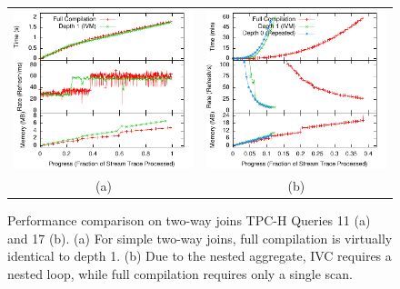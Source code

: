 \begin{figure}
\begin{center}
\vspace*{0.2in}

\begin{minipage}{\textwidth}
\begin{center}
\begin{tabular}{cc}
\includegraphics[width=\figurewidth]{../graphs/graphs/unified_tpch11.pdf} &
\includegraphics[width=\figurewidth]{../graphs/graphs/unified_tpch17.pdf} \\
(a) & (b)
\end{tabular}
\caption{Performance comparison on two-way joins TPC-H Queries 11 (a) and 17 (b).  (a) For simple two-way joins, full compilation is virtually identical to depth 1. (b) Due to the nested aggregate, IVC requires a nested loop, while full compilation requires only a single scan.}
\label{fig:experiments:tpch17}
\label{fig:experiments:tpch11}
\end{center}
\end{minipage}


\end{center}
\end{figure}
